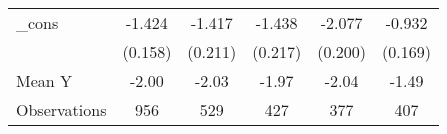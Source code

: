 {\begin{tabular}{l*{5}{c}}
\addlinespace
\_cons      &      -1.424\sym{***}&      -1.417\sym{***}&      -1.438\sym{***}&      -2.077\sym{***}&      -0.932\sym{***}\\
            &     (0.158)         &     (0.211)         &     (0.217)         &     (0.200)         &     (0.169)         \\
\midrule
Mean Y      &       -2.00         &       -2.03         &       -1.97         &       -2.04         &       -1.49         \\
Observations&         956         &         529         &         427         &         377         &         407         \\
\bottomrule
\end{tabular}
}
